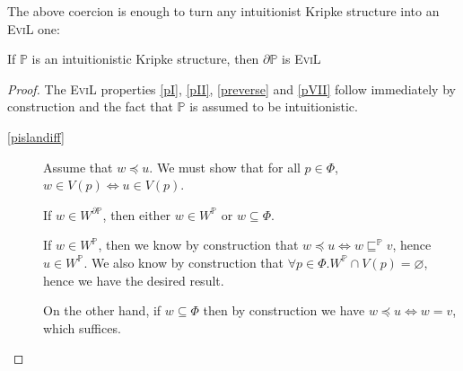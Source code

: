 The above coercion is enough to turn any intuitionist Kripke structure
into an \textsc{EviL} one:
\begin{lemma}\label{turningevil}
If $\mathbb{P}$ is an intuitionistic Kripke structure, then $\partial
\mathbb{P}$ is \textsc{EviL}
\end{lemma}
\begin{proof}
The \textsc{EviL} properties \ref{pI}, \ref{pII}, \ref{preverse} and
\ref{pVII} follow immediately by construction and the fact that
$\mathbb{P}$ is assumed to be intuitionistic. 
 \begin{description}
    \item[\ref{pislandiff}]  Assume that $w\preccurlyeq u$.  We must
      show that for all $p \in \Phi$, $w \in V(p) \iff u \in V(p)$.

If $w \in W^{\partial\mathbb{P}}$, then either $w \in W^\mathbb{P}$ or
$w \subseteq \Phi$.

      If $w \in W^\mathbb{P}$, then we know by construction that $w
      \preccurlyeq u \iff w \sqsubseteq^{\mathbb{P}} v$,  hence
       $u \in W^\mathbb{P}$.  We also know by construction that
       $\forall p \in \Phi. W^\mathbb{P} \cap V(p) = \varnothing$,
       hence we have the desired result.

     On the other hand, if $w \subseteq \Phi$ then by construction we
     have $w \preccurlyeq u \iff w = v$, which suffices.


\end{description}
\end{proof}
